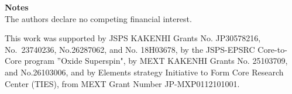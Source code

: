 \documentclass[journal=nalefd,manuscript=article,layout=twocolumn]{achemso}
\begin{document}

{\bf Notes}\\
The authors declare no competing financial interest. 


\begin{acknowledgement}
This work was supported by JSPS KAKENHI Grants No. JP30578216, No.~23740236,  No.26287062, and No. 18H03678, 
by the JSPS-EPSRC Core-to-Core program ''Oxide Superspin",
by
MEXT KAKENHI Grants No. 25103709, and No.26103006, 
and by Elements strategy Initiative to Form Core Research Center (TIES), from MEXT Grant Number JP-MXP0112101001.
\end{acknowledgement}
\end{document}
